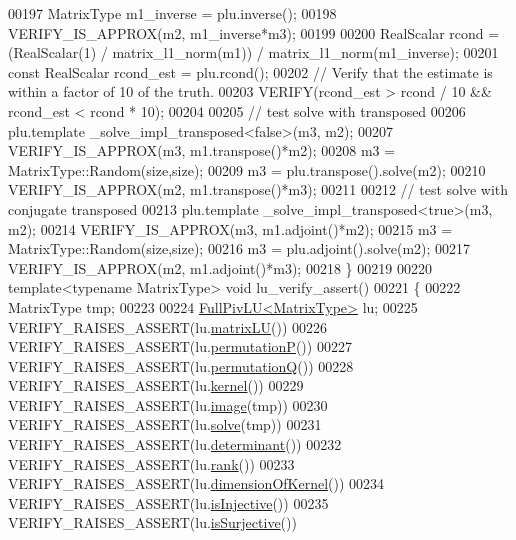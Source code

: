 \begin{DoxyCode}
00197   MatrixType m1\_inverse = plu.inverse();
00198   VERIFY\_IS\_APPROX(m2, m1\_inverse*m3);
00199 
00200   RealScalar rcond = (RealScalar(1) / matrix\_l1\_norm(m1)) / matrix\_l1\_norm(m1\_inverse);
00201   \textcolor{keyword}{const} RealScalar rcond\_est = plu.rcond();
00202   \textcolor{comment}{// Verify that the estimate is within a factor of 10 of the truth.}
00203   VERIFY(rcond\_est > rcond / 10 && rcond\_est < rcond * 10);
00204 
00205   \textcolor{comment}{// test solve with transposed}
00206   plu.template \_solve\_impl\_transposed<false>(m3, m2);
00207   VERIFY\_IS\_APPROX(m3, m1.transpose()*m2);
00208   m3 = MatrixType::Random(size,size);
00209   m3 = plu.transpose().solve(m2);
00210   VERIFY\_IS\_APPROX(m2, m1.transpose()*m3);
00211 
00212   \textcolor{comment}{// test solve with conjugate transposed}
00213   plu.template \_solve\_impl\_transposed<true>(m3, m2);
00214   VERIFY\_IS\_APPROX(m3, m1.adjoint()*m2);
00215   m3 = MatrixType::Random(size,size);
00216   m3 = plu.adjoint().solve(m2);
00217   VERIFY\_IS\_APPROX(m2, m1.adjoint()*m3);
00218 \}
00219 
00220 \textcolor{keyword}{template}<\textcolor{keyword}{typename} MatrixType> \textcolor{keywordtype}{void} lu\_verify\_assert()
00221 \{
00222   MatrixType tmp;
00223 
00224   \hyperlink{group___l_u___module_class_eigen_1_1_full_piv_l_u}{FullPivLU<MatrixType>} lu;
00225   VERIFY\_RAISES\_ASSERT(lu.\hyperlink{group___l_u___module_afea0b8fc707a9097d46fe358cb18bbff}{matrixLU}())
00226   VERIFY\_RAISES\_ASSERT(lu.\hyperlink{group___l_u___module_a09274c82240f6441af5e6c99e24e756d}{permutationP}())
00227   VERIFY\_RAISES\_ASSERT(lu.\hyperlink{group___l_u___module_a8d18190c7618de271cba7293f0493a36}{permutationQ}())
00228   VERIFY\_RAISES\_ASSERT(lu.\hyperlink{group___l_u___module_a70f52eeb2cd07dfbf790fce106fb4015}{kernel}())
00229   VERIFY\_RAISES\_ASSERT(lu.\hyperlink{group___l_u___module_a0893985d2dab367baa6e57c6fd0c4956}{image}(tmp))
00230   VERIFY\_RAISES\_ASSERT(lu.\hyperlink{group___l_u___module_af563471f6f3283fd10779ef02dd0b748}{solve}(tmp))
00231   VERIFY\_RAISES\_ASSERT(lu.\hyperlink{group___l_u___module_a71654e5c60a26407ecccfaa5b34bb0aa}{determinant}())
00232   VERIFY\_RAISES\_ASSERT(lu.\hyperlink{group___l_u___module_a67a870aa69e699e058d04802ba0bdad9}{rank}())
00233   VERIFY\_RAISES\_ASSERT(lu.\hyperlink{group___l_u___module_a64e191225834e91161ea53ad4b78167b}{dimensionOfKernel}())
00234   VERIFY\_RAISES\_ASSERT(lu.\hyperlink{group___l_u___module_ab13992c852aa593461d9b81790b56667}{isInjective}())
00235   VERIFY\_RAISES\_ASSERT(lu.\hyperlink{group___l_u___module_a1f6222875fc3a181ee1544b9b36dfda5}{isSurjective}())

\end{DoxyCode}
